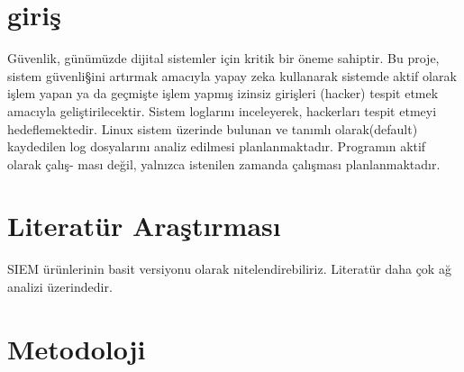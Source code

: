 \documentclass[12pt,a4paper]{article}
\begin{document}
	\begin{enumerate}
	 \section{giriş}\newline\newline
Güvenlik, günümüzde dijital sistemler için kritik bir öneme sahiptir.
Bu proje, sistem güvenli§ini artırmak amacıyla yapay zeka kullanarak sistemde aktif olarak işlem yapan ya da geçmişte işlem yapmış izinsiz girişleri
(hacker) tespit etmek amacıyla geliştirilecektir. Sistem loglarını inceleyerek,
hackerları tespit etmeyi hedeflemektedir.\newline
Linux sistem üzerinde bulunan ve tanımlı olarak(default) kaydedilen log
dosyalarını analiz edilmesi planlanmaktadır. Programın aktif olarak çalış-
ması değil, yalnızca istenilen zamanda çalışması planlanmaktadır.
\newline
	
 \section{ Literatür Araştırması}\newline\newline
SIEM ürünlerinin basit versiyonu olarak nitelendirebiliriz. Literatür daha
çok ağ analizi üzerindedir.
\newline

 \section{Metodoloji}
  \begin{itemize}

\end{itemize}
\end{enumerate}
\end{document}
